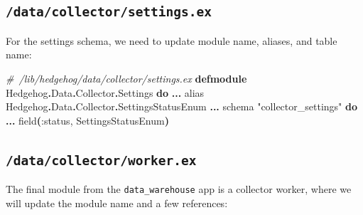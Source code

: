 \documentclass[
  oneside]{book}
\newenvironment{Shaded}{\begin{snugshade}}{\end{snugshade}}
\newcommand{\CommentTok}[1]{\textcolor[rgb]{0.56,0.35,0.01}{\textit{#1}}}
\newcommand{\ConstantTok}[1]{\textcolor[rgb]{0.56,0.35,0.01}{#1}}
\newcommand{\FunctionTok}[1]{\textcolor[rgb]{0.13,0.29,0.53}{\textbf{#1}}}
\newcommand{\ImportTok}[1]{#1}
\newcommand{\KeywordTok}[1]{\textcolor[rgb]{0.13,0.29,0.53}{\textbf{#1}}}
\newcommand{\NormalTok}[1]{#1}
\newcommand{\OperatorTok}[1]{\textcolor[rgb]{0.81,0.36,0.00}{\textbf{#1}}}
\newcommand{\StringTok}[1]{\textcolor[rgb]{0.31,0.60,0.02}{#1}}
\newcommand{\VariableTok}[1]{\textcolor[rgb]{0.00,0.00,0.00}{#1}}
\begin{document}
\subsection{\texorpdfstring{\texttt{/data/collector/settings.ex}}{/data/collector/settings.ex}}\label{datacollectorsettings.ex}

For the settings schema, we need to update module name, aliases, and table name:

\begin{Shaded}
\begin{Highlighting}[]
\CommentTok{\# /lib/hedgehog/data/collector/settings.ex}
\KeywordTok{defmodule} \ConstantTok{Hedgehog}\OperatorTok{.}\ConstantTok{Data}\OperatorTok{.}\ConstantTok{Collector}\OperatorTok{.}\ConstantTok{Settings} \KeywordTok{do}
  \OperatorTok{...}
  \ImportTok{alias} \ConstantTok{Hedgehog}\OperatorTok{.}\ConstantTok{Data}\OperatorTok{.}\ConstantTok{Collector}\OperatorTok{.}\ConstantTok{SettingsStatusEnum}
  \OperatorTok{...}
\NormalTok{  schema }\StringTok{"collector\_settings"} \KeywordTok{do}
    \OperatorTok{...}
\NormalTok{    field}\FunctionTok{(}\VariableTok{:status}\NormalTok{, }\ConstantTok{SettingsStatusEnum}\FunctionTok{)}
\end{Highlighting}
\end{Shaded}

\subsection{\texorpdfstring{\texttt{/data/collector/worker.ex}}{/data/collector/worker.ex}}\label{datacollectorworker.ex}

The final module from the \texttt{data\_warehouse} app is a collector worker, where we will update the module name and a few references:
\end{document}
